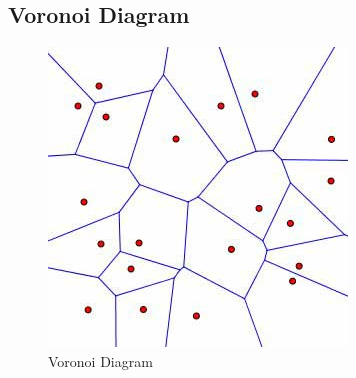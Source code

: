 \begin{appendix}
\section{Voronoi Diagram}
\begin{figure}[H]
	\centering
    \label{voronoipic}
    \includegraphics[scale=0.65]{1_Introduction/voronoi.jpg}
    \caption{Voronoi Diagram\cite{voronoipic}}
\end{figure}
\end{appendix}
